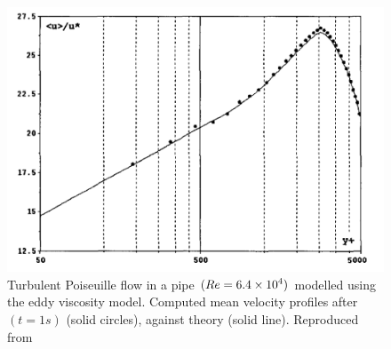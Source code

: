 \begin{figure}[htbp!]
    \centering
    \includegraphics{Figures/research_papers/violeau2002-eddy-viscosity-result.png}
    \caption{Turbulent Poiseuille flow in a pipe $(Re = 6.4 \times {10}^{4})$ modelled using the eddy viscosity model. Computed mean velocity profiles after $(t=1s)$ (solid circles), against theory (solid line). Reproduced from \cite{VIOLEAU2002}}
    \label{fig:violeau2002-eddy-viscosity-result}
\end{figure}

